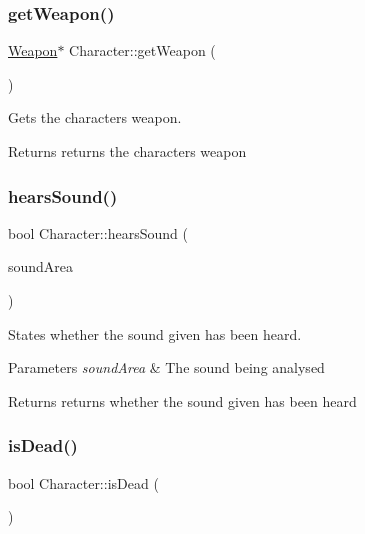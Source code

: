 \subsubsection{\texorpdfstring{get\+Weapon()}{getWeapon()}}
{\footnotesize\ttfamily \hyperlink{class_weapon}{Weapon}$\ast$ Character\+::get\+Weapon (\begin{DoxyParamCaption}{ }\end{DoxyParamCaption})}



Gets the characters weapon. 

\begin{DoxyReturn}{Returns}
returns the characters weapon 
\end{DoxyReturn}
\mbox{\label{class_character_a3bf37110e85ed79119ddb103fab670e4}} 
\subsubsection{\texorpdfstring{hears\+Sound()}{hearsSound()}}
{\footnotesize\ttfamily bool Character\+::hears\+Sound (\begin{DoxyParamCaption}\item[{\hyperlink{classsound_wave}{sound\+Wave} $\ast$}]{sound\+Area }\end{DoxyParamCaption})}



States whether the sound given has been heard. 


\begin{DoxyParams}{Parameters}
{\em sound\+Area} & The sound being analysed \\
\hline
\end{DoxyParams}
\begin{DoxyReturn}{Returns}
returns whether the sound given has been heard 
\end{DoxyReturn}
\mbox{\label{class_character_a16c884ce2071ab8f4a715de559b2f2fc}} 
\subsubsection{\texorpdfstring{is\+Dead()}{isDead()}}
{\footnotesize\ttfamily bool Character\+::is\+Dead (\begin{DoxyParamCaption}{ }\end{DoxyParamCaption})}



